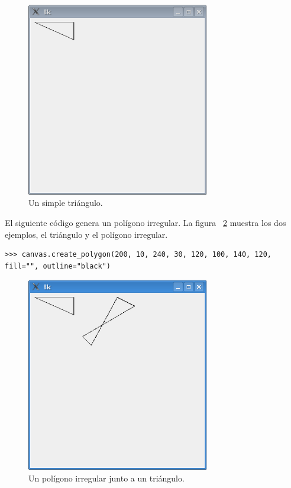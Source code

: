 \begin{figure}
\begin{center}
\includegraphics[width=80mm]{figure41.eps}
\end{center}
\caption{Un simple triángulo.}\label{fig41}
\end{figure}

El siguiente código genera un polígono irregular. La figura ~\ref{fig42} muestra los dos ejemplos, el triángulo y el polígono irregular.

\begin{listing}
\begin{verbatim}
>>> canvas.create_polygon(200, 10, 240, 30, 120, 100, 140, 120, fill="", outline="black")
\end{verbatim}
\end{listing}

\begin{figure}
\begin{center}
\includegraphics[width=80mm]{figure42.eps}
\end{center}
\caption{Un polígono irregular junto a un triángulo.}\label{fig42}
\end{figure}

